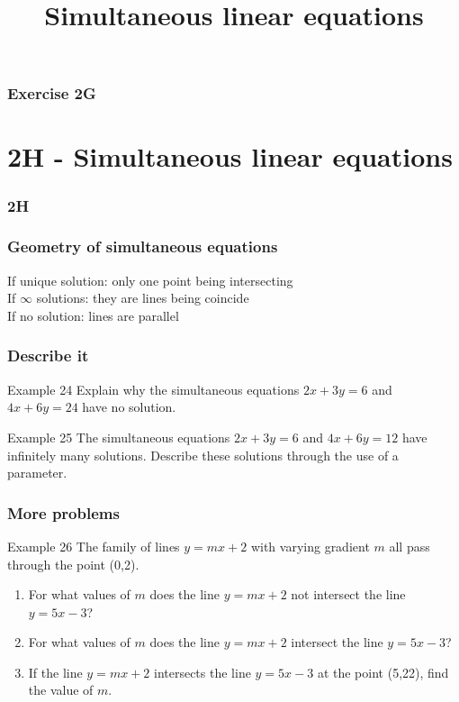 \documentclass{beamer}
\begin{document}
\begin{frame}
    \frametitle{Exercise 2G}
\end{frame}

\section{2H - Simultaneous linear equations}
\begin{frame}
    \frametitle{2H}
    \begin{center}
        \title{Simultaneous linear equations}
        \maketitle
    \end{center}
\end{frame}

\begin{frame}
    \frametitle{Geometry of simultaneous equations}
    If unique solution: only one point being intersecting\\
    If $\infty$ solutions: they are lines being coincide\\
    If no solution: lines are parallel
\end{frame}


\begin{frame}[t]
    \frametitle{Describe it}
    \begin{block}{Example 24}
        Explain why the simultaneous equations $2x + 3y = 6$ and $4x + 6y = 24$ have no solution. 
    \end{block}
    \begin{block}{Example 25}
        The simultaneous equations $2x + 3y = 6$ and $4x + 6y = 12$ have infinitely many solutions.
 Describe these solutions through the use of a parameter.
    \end{block}
\end{frame}

\begin{frame}[t]
    \frametitle{More problems}
    \begin{block}{Example 26}
        The family of lines $y = mx + 2$ with varying gradient $m$ all pass through the point (0,2).\\
        \begin{enumerate}
            \item  For what values of $m$ does the line $y = mx +2$ not intersect the line $y = 5x- 3$?
            \item For what values of $m$ does the line $y = mx +2$ intersect the line $y = 5x- 3$?
            \item  If the line $y = mx+2$ intersects the line $y = 5x - 3$ at the point (5,22), find the value
            of $m$.
        \end{enumerate}
    \end{block}
\end{frame}
\end{document}
